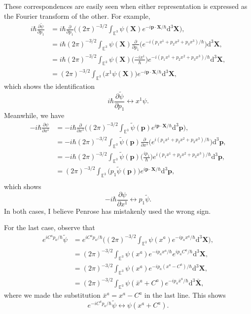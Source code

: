 \documentclass[../road-to-reality.tex]{subfiles}
\begin{document}
\begin{questions}
\begin{solution}
	These correspondences are easily seen when either representation is expressed as the Fourier transform of the other. For example,
	\begin{align*}
		i\hbar\frac{\partial\tilde{\psi}}{\partial{p_1}} &= i\hbar\frac{\partial}{\partial{p_1}}\Big((2\pi)^{-3/2}\int_{\mathbb{E}^3}\psi(\mathbf{X})e^{-i\mathbf{p}\cdot\mathbf{X}/\hbar}\mathrm{d}^3\mathbf{X}\Big), \\
		&= i\hbar(2\pi)^{-3/2}\int_{\mathbb{E}^3}\psi(\mathbf{X})\frac{\partial}{\partial{p_1}}\Big(e^{-i(p_1x^1+p_2x^2+p_3x^3)/\hbar}\Big)\mathrm{d}^3\mathbf{X}, \\
		&= i\hbar(2\pi)^{-3/2}\int_{\mathbb{E}^3}\psi(\mathbf{X})\Big(\frac{-ix^1}{\hbar}\Big)e^{-i(p_1x^1+p_2x^2+p_3x^3)/\hbar}\mathrm{d}^3\mathbf{X}, \\
		&= (2\pi)^{-3/2}\int_{\mathbb{E}^3}\Big(x^1\psi(\mathbf{X})\Big)e^{-i\mathbf{p}\cdot\mathbf{X}/\hbar}\mathrm{d}^3\mathbf{X},
	\end{align*}
	which shows the identification
	\[
		i\hbar\frac{\partial\tilde{\psi}}{\partial{p_1}} \leftrightarrow x^1\psi.
	\]
	Meanwhile, we have
	\begin{align*}
		-i\hbar\frac{\partial\psi}{\partial{x^1}} &= -i\hbar\frac{\partial}{\partial{x^1}}\Big((2\pi)^{-3/2}\int_{\mathbb{E}^3}\tilde{\psi}(\mathbf{p})e^{i\mathbf{p}\cdot\mathbf{X}/\hbar}\mathrm{d}^3\mathbf{p}\Big), \\
		&= -i\hbar(2\pi)^{-3/2}\int_{\mathbb{E}^3}\tilde{\psi}(\mathbf{p})\frac{\partial}{\partial{x^1}}\Big(e^{i(p_1x^1 + p_2x^2 + p_3x^3)/\hbar}\Big)\mathrm{d}^3\mathbf{p}, \\
		&= -i\hbar(2\pi)^{-3/2}\int_{\mathbb{E}^3}\tilde{\psi}(\mathbf{p})\Big(\frac{ip_1}{\hbar}\Big)e^{i(p_1x^1 + p_2x^2 + p_3x^3)/\hbar}\mathrm{d}^3\mathbf{p}, \\
		&= (2\pi)^{-3/2}\int_{\mathbb{E}^3}\Big(p_1\tilde{\psi}(\mathbf{p})\Big)e^{i\mathbf{p}\cdot\mathbf{X}/\hbar}\mathrm{d}^3\mathbf{p}, \\
	\end{align*}
	which shows 
	\[
		-i\hbar\frac{\partial{\psi}}{\partial{x^1}} \leftrightarrow p_1\tilde{\psi}.
	\]
	In both cases, I believe Penrose has mistakenly used the wrong sign.
	
	For the last case, observe that
	\begin{align*}
		e^{iC^ap_a/\hbar}\tilde{\psi} &= e^{iC^ap_a/\hbar}\Big((2\pi)^{-3/2}\int_{\mathbb{E}^3}\psi(x^a)e^{-ip_ax^a/\hbar}\mathrm{d}^3\mathbf{X}\Big), \\
		&= (2\pi)^{-3/2}\int_{\mathbb{E}^3}\psi(x^a)e^{-ip_ax^a/\hbar}e^{ip_aC^a/\hbar}\mathrm{d}^3\mathbf{X}, \\
		&= (2\pi)^{-3/2}\int_{\mathbb{E}^3}\psi(x^a)e^{-ip_a(x^a-C^a)/\hbar}\mathrm{d}^3\mathbf{X}, \\
		&= (2\pi)^{-3/2}\int_{\mathbb{E}^3}\psi(\bar{x}^a+C^a)e^{-ip_a\bar{x}^a/\hbar}\mathrm{d}^3\bar{\mathbf{X}},
	\end{align*}
	where we made the substitution $\bar{x}^a = x^a - C^a$ in the last line. This shows
	\[
		e^{-iC^ap_a/\hbar}\tilde{\psi} \leftrightarrow \psi(x^a+C^a).
	\]
	

\end{solution}
\end{questions}
\end{document}
